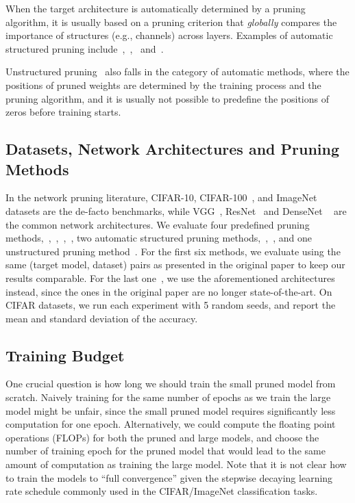 When the target architecture is automatically determined by a pruning algorithm, it is usually based on a pruning criterion that \emph{globally} compares the importance of structures (e.g., channels) across layers. Examples of automatic structured pruning include~\cite{liu2017learning},~\cite{huang2018data},~\cite{nvidia} and~\cite{pfa}. 

Unstructured pruning~\cite{han2015learning, vdropout, l0sparse} also falls in the category of automatic methods, where the positions of pruned weights are determined by the training process and the pruning algorithm, and it is usually not possible to predefine the positions of zeros before training starts.

\subsection{Datasets, Network Architectures and Pruning Methods}
In the network pruning literature, CIFAR-10, CIFAR-100~\cite{cifar}, and ImageNet~\cite{deng2009} datasets are the de-facto benchmarks, while VGG~\cite{vgg}, ResNet~\cite{resnet} and DenseNet ~\cite{densenet} are the common network architectures. 
We evaluate four predefined pruning methods,~\cite{li2016pruning},~\cite{luo2017thinet},~\cite{he2017channel},~\cite{he2018sfp}, two automatic structured pruning methods,~\cite{liu2017learning},~\cite{ huang2018data}, and one unstructured pruning method~\cite{han2015learning}. For the first six methods, we evaluate using the same (target model, dataset) pairs as presented in the original paper to keep our results comparable. For the last one~\cite{han2015learning}, we use the aforementioned architectures instead, since the ones in the original paper are no longer state-of-the-art. On CIFAR datasets, we run each experiment with 5 random seeds, and report the mean and standard deviation of the accuracy. 

\subsection{Training Budget}
One crucial question is how long we should train the small pruned model from scratch. Naively training for the same number of epochs as we train the large model might be unfair, since the small pruned model requires significantly less computation for one epoch. Alternatively, we could compute the floating point operations (FLOPs) for both the pruned and large models, and choose the number of training epoch for the pruned model that would lead to the same amount of computation as training the large model. Note that it is not clear how to train the models to ``full convergence'' given the stepwise decaying learning rate schedule commonly used in the CIFAR/ImageNet classification tasks. 

